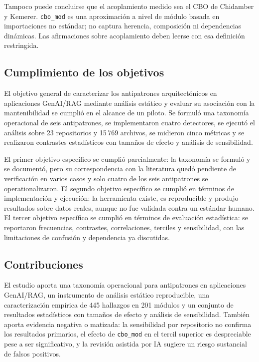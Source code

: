 Tampoco puede concluirse que el acoplamiento medido sea el CBO de Chidamber y Kemerer. \texttt{cbo\_mod} es una aproximación a nivel de módulo basada en importaciones no estándar; no captura herencia, composición ni dependencias dinámicas. Las afirmaciones sobre acoplamiento deben leerse con esa definición restringida.

\subsection{Cumplimiento de los objetivos}

El objetivo general de caracterizar los antipatrones arquitectónicos en aplicaciones GenAI/RAG mediante análisis estático y evaluar su asociación con la mantenibilidad se cumplió en el alcance de un piloto. Se formuló una taxonomía operacional de seis antipatrones, se implementaron cuatro detectores, se ejecutó el análisis sobre 23 repositorios y 15\,769 archivos, se midieron cinco métricas y se realizaron contrastes estadísticos con tamaños de efecto y análisis de sensibilidad.

El primer objetivo específico se cumplió parcialmente: la taxonomía se formuló y se documentó, pero su correspondencia con la literatura quedó pendiente de verificación en varios casos y solo cuatro de los seis antipatrones se operationalizaron. El segundo objetivo específico se cumplió en términos de implementación y ejecución: la herramienta existe, es reproducible y produjo resultados sobre datos reales, aunque no fue validada contra un estándar humano. El tercer objetivo específico se cumplió en términos de evaluación estadística: se reportaron frecuencias, contrastes, correlaciones, terciles y sensibilidad, con las limitaciones de confusión y dependencia ya discutidas.

\subsection{Contribuciones}

El estudio aporta una taxonomía operacional para antipatrones en aplicaciones GenAI/RAG, un instrumento de análisis estático reproducible, una caracterización empírica de 445 hallazgos en 201 módulos y un conjunto de resultados estadísticos con tamaños de efecto y análisis de sensibilidad. También aporta evidencia negativa o matizada: la sensibilidad por repositorio no confirma los resultados primarios, el efecto de \texttt{cbo\_mod} en el tercil superior es despreciable pese a ser significativo, y la revisión asistida por IA sugiere un riesgo sustancial de falsos positivos.


